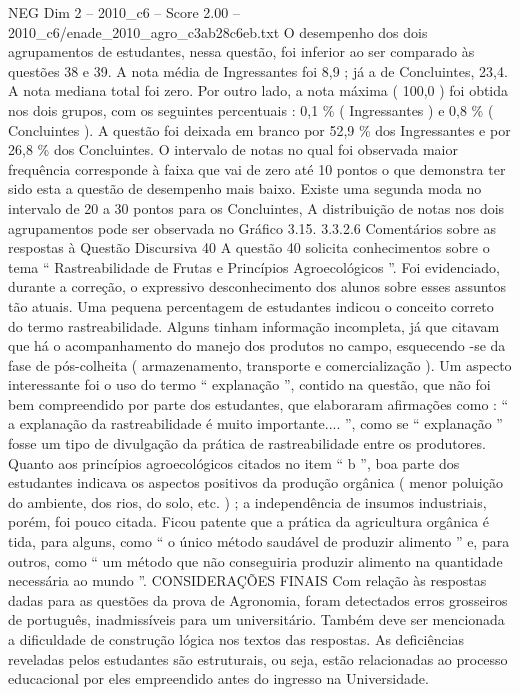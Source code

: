 \begin{textsample}{NEG Dim 2 – 2010\_c6 – Score 2.00 – 2010\_c6/enade\_2010\_agro\_c3ab28c6eb.txt}
O desempenho dos dois agrupamentos de estudantes, nessa questão, foi inferior ao ser comparado às questões 38 e 39.
A nota média de Ingressantes foi 8,9 ; já a de Concluintes, 23,4.
A nota mediana total foi zero.
Por outro lado, a nota máxima ( 100,0 ) foi obtida nos dois grupos, com os seguintes percentuais : 0,1 \% ( Ingressantes ) e 0,8 \% ( Concluintes ).
A questão foi deixada em branco por 52,9 \% dos Ingressantes e por 26,8 \% dos Concluintes.
O intervalo de notas no qual foi observada maior frequência corresponde à faixa que vai de zero até 10 pontos o que demonstra ter sido esta a questão de desempenho mais baixo.
Existe uma segunda moda no intervalo de 20 a 30 pontos para os Concluintes, A distribuição de notas nos dois agrupamentos pode ser observada no Gráfico 3.15. 3.3.2.6 Comentários sobre as respostas à Questão Discursiva 40 A questão 40 solicita conhecimentos sobre o tema “ Rastreabilidade de Frutas e Princípios Agroecológicos ”.
Foi evidenciado, durante a correção, o expressivo desconhecimento dos alunos sobre esses assuntos tão atuais.
Uma pequena percentagem de estudantes indicou o conceito correto do termo rastreabilidade.
Alguns tinham informação incompleta, já que citavam que há o acompanhamento do manejo dos produtos no campo, esquecendo -se da fase de pós-colheita ( armazenamento, transporte e comercialização ).
Um aspecto interessante foi o uso do termo “ explanação ”, contido na questão, que não foi bem compreendido por parte dos estudantes, que elaboraram afirmações como : “ a explanação da rastreabilidade é muito importante.... ”, como se “ explanação ” fosse um tipo de divulgação da prática de rastreabilidade entre os produtores.
Quanto aos princípios agroecológicos citados no item “ b ”, boa parte dos estudantes indicava os aspectos positivos da produção orgânica ( menor poluição do ambiente, dos rios, do solo, etc. ) ; a independência de insumos industriais, porém, foi pouco citada.
Ficou patente que a prática da agricultura orgânica é tida, para alguns, como “ o único método saudável de produzir alimento ” e, para outros, como “ um método que não conseguiria produzir alimento na quantidade necessária ao mundo ”.
CONSIDERAÇÕES FINAIS Com relação às respostas dadas para as questões da prova de Agronomia, foram detectados erros grosseiros de português, inadmissíveis para um universitário.
Também deve ser mencionada a dificuldade de construção lógica nos textos das respostas.
As deficiências reveladas pelos estudantes são estruturais, ou seja, estão relacionadas ao processo educacional por eles empreendido antes do ingresso na Universidade.

\end{textsample}
